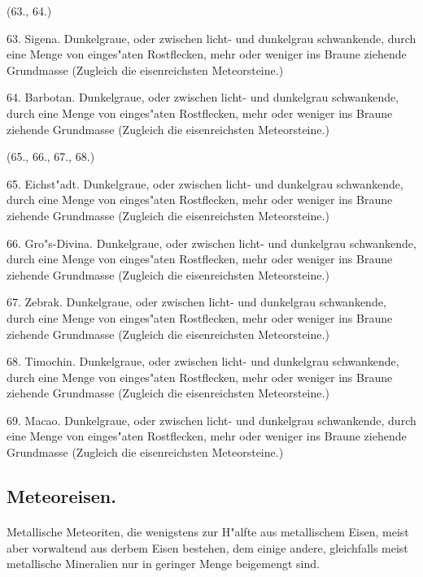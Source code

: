 \documentclass[a4paper, 11pt, oneside, polutonikogreek, german]{article}
\begin{document}
\begin{center}
(63., 64.)
\end{center}

63. Sigena. Dunkelgraue, oder zwischen licht- und dunkelgrau schwankende, durch eine Menge von einges"aten Rostflecken, mehr oder weniger ins Braune ziehende Grundmasse (Zugleich die eisenreichsten Meteorsteine.)

64. Barbotan. Dunkelgraue, oder zwischen licht- und dunkelgrau schwankende, durch eine Menge von einges"aten Rostflecken, mehr oder weniger ins Braune ziehende Grundmasse (Zugleich die eisenreichsten Meteorsteine.)

\begin{center}
(65., 66., 67., 68.)
\end{center}

65. Eichst"adt. Dunkelgraue, oder zwischen licht- und dunkelgrau schwankende, durch eine Menge von einges"aten Rostflecken, mehr oder weniger ins Braune ziehende Grundmasse (Zugleich die eisenreichsten Meteorsteine.)

66. Gro"s-Divina. Dunkelgraue, oder zwischen licht- und dunkelgrau schwankende, durch eine Menge von einges"aten Rostflecken, mehr oder weniger ins Braune ziehende Grundmasse (Zugleich die eisenreichsten Meteorsteine.)

67. Zebrak. Dunkelgraue, oder zwischen licht- und dunkelgrau schwankende, durch eine Menge von einges"aten Rostflecken, mehr oder weniger ins Braune ziehende Grundmasse (Zugleich die eisenreichsten Meteorsteine.)

68. Timochin. Dunkelgraue, oder zwischen licht- und dunkelgrau schwankende, durch eine Menge von einges"aten Rostflecken, mehr oder weniger ins Braune ziehende Grundmasse (Zugleich die eisenreichsten Meteorsteine.)

\vspace{2ex}

69. Macao. Dunkelgraue, oder zwischen licht- und dunkelgrau schwankende, durch eine Menge von einges"aten Rostflecken, mehr oder weniger ins Braune ziehende Grundmasse (Zugleich die eisenreichsten Meteorsteine.)
\subsection{Meteoreisen.}
\paragraph{}
Metallische Meteoriten, die wenigstens zur H"alfte aus metallischem Eisen, meist aber vorwaltend aus derbem Eisen bestehen, dem einige andere, gleichfalls meist metallische Mineralien nur in geringer Menge beigemengt sind.
\end{document}

